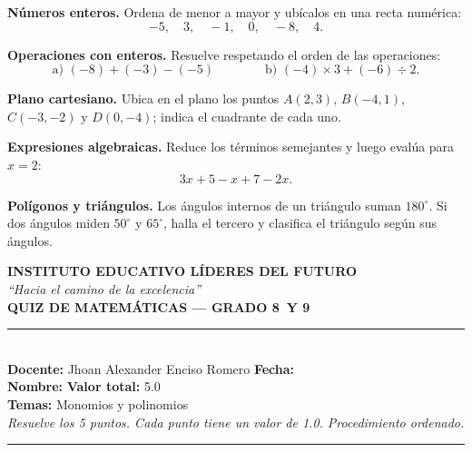 \documentclass[11pt]{article}
\newcommand{\linea}[1]{\underline{\hspace{#1}}}
\newcommand{\encabezadoquiz}[2]{%
  \begin{center}
    {\large\bfseries INSTITUTO EDUCATIVO LÍDERES DEL FUTURO}\\[2pt]
    {\itshape\small ``Hacia el camino de la excelencia''}\\[5pt]
    {\Large\bfseries QUIZ DE MATEMÁTICAS --- GRADO #1}
  \end{center}
  \vspace{2pt}
  \noindent\rule{\textwidth}{0.8pt}\\[6pt]
  \noindent\textbf{Docente:} Jhoan Alexander Enciso Romero \hfill \textbf{Fecha:} \linea{3.2cm}\\[8pt]
  \noindent\textbf{Nombre:} \linea{9cm} \hfill \textbf{Valor total:} 5.0\\[6pt]
  \noindent\textbf{Temas:} #2\\[2pt]
  \noindent\textit{\small Resuelve los 5 puntos. Cada punto tiene un valor de 1.0. Procedimiento ordenado.}
  \par\vspace{4pt}\noindent\rule{\textwidth}{0.4pt}\par\vspace{8pt}
}
\begin{document}
\begin{puntos}
  \item \textbf{Números enteros.} Ordena de menor a mayor y ubícalos en una recta numérica:
        \[ -5,\quad 3,\quad -1,\quad 0,\quad -8,\quad 4. \]

  \item \textbf{Operaciones con enteros.} Resuelve respetando el orden de las operaciones:
        \[ \text{a) } (-8)+(-3)-(-5) \qquad\qquad \text{b) } (-4)\times 3 + (-6)\div 2. \]

  \item \textbf{Plano cartesiano.} Ubica en el plano los puntos
        $A(2,3)$, $B(-4,1)$, $C(-3,-2)$ y $D(0,-4)$; indica el cuadrante de cada uno.
        \begin{center}
        \end{center}

  \item \textbf{Expresiones algebraicas.} Reduce los términos semejantes y luego evalúa para $x=2$:
        \[ 3x + 5 - x + 7 - 2x. \]

  \item \textbf{Polígonos y triángulos.} Los ángulos internos de un triángulo suman $180^{\circ}$.
        Si dos ángulos miden $50^{\circ}$ y $65^{\circ}$, halla el tercero y clasifica el triángulo según sus ángulos.
\end{puntos}

\newpage

\encabezadoquiz{8\textdegree\ Y 9\textdegree}{Monomios y polinomios}
\end{document}
